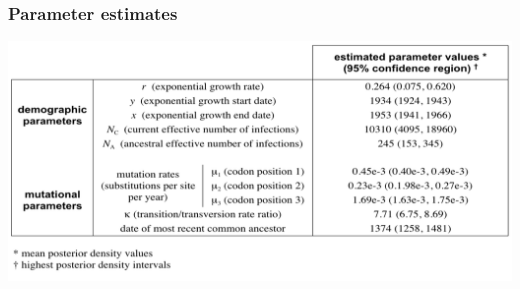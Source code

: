 \begin{frame}
\frametitle{Parameter estimates}

\includegraphics[width=\textwidth]{../../images/ParameterEstimates}

\end{frame}

